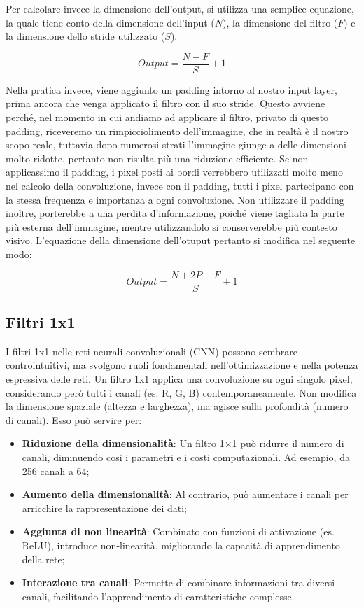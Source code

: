 Per calcolare invece la dimensione dell'output, si utilizza una semplice equazione, la quale tiene conto della dimensione dell'input ($N$), la dimensione del filtro ($F$) e la dimensione dello stride utilizzato ($S$).

\begin{equation}
    Output = \frac{N-F}{S} + 1
\end{equation}

Nella pratica invece, viene aggiunto un padding intorno al nostro input layer, prima ancora che venga applicato il filtro con il suo stride. Questo avviene perché, nel momento in cui andiamo ad applicare il filtro, privato di questo padding, riceveremo un rimpicciolimento dell'immagine, che in realtà è il nostro scopo reale, tuttavia dopo numerosi strati l'immagine giunge a delle dimensioni molto ridotte, pertanto non risulta più una riduzione efficiente. Se non applicassimo il padding, i pixel posti ai bordi verrebbero utilizzati molto meno nel calcolo della convoluzione, invece con il padding, tutti i pixel partecipano con la stessa frequenza e importanza a ogni convoluzione. Non utilizzare il padding inoltre, porterebbe a una perdita d'informazione, poiché viene tagliata la parte più esterna dell'immagine, mentre utilizzandolo si conserverebbe più contesto visivo. L'equazione della dimensione dell'otuput pertanto si modifica nel seguente modo:

\begin{equation}
    Output = \frac{N+2P-F}{S} +1
\end{equation}

\subsection{Filtri 1x1}

I filtri 1x1 nelle reti neurali convoluzionali (CNN) possono sembrare controintuitivi, ma svolgono ruoli fondamentali nell'ottimizzazione e nella potenza espressiva delle reti. Un filtro 1x1 applica una convoluzione su ogni singolo pixel, considerando però tutti i canali (es. R, G, B) contemporaneamente. Non modifica la dimensione spaziale (altezza e larghezza), ma agisce sulla profondità (numero di canali). Esso può servire per:

\begin{itemize}
    \item \textbf{Riduzione della dimensionalità}: Un filtro 1×1 può ridurre il numero di canali, diminuendo così i parametri e i costi computazionali. Ad esempio, da 256 canali a 64;
    \item \textbf{Aumento della dimensionalità}: Al contrario, può aumentare i canali per arricchire la rappresentazione dei dati;
    \item \textbf{Aggiunta di non linearità}: Combinato con funzioni di attivazione (es. ReLU), introduce non-linearità, migliorando la capacità di apprendimento della rete;
    \item \textbf{Interazione tra canali}: Permette di combinare informazioni tra diversi canali, facilitando l'apprendimento di caratteristiche complesse.
\end{itemize}


